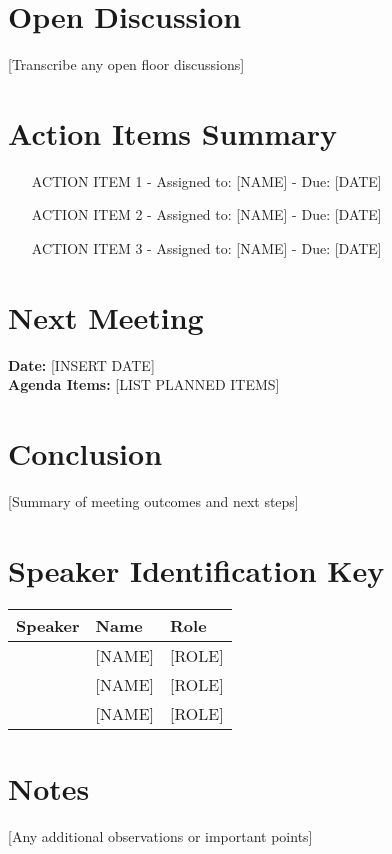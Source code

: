 \documentclass[12pt,a4paper]{article}
\begin{document}
\section{Open Discussion}
[Transcribe any open floor discussions]

\section{Action Items Summary}
\begin{itemize}
    \item [ACTION ITEM 1] - Assigned to: [NAME] - Due: [DATE]
    \item [ACTION ITEM 2] - Assigned to: [NAME] - Due: [DATE]
    \item [ACTION ITEM 3] - Assigned to: [NAME] - Due: [DATE]
\end{itemize}

\section{Next Meeting}
\textbf{Date:} [INSERT DATE] \\
\textbf{Agenda Items:} [LIST PLANNED ITEMS]

\section{Conclusion}
[Summary of meeting outcomes and next steps]

\section*{Speaker Identification Key}
\begin{tabular}{lll}
\textbf{Speaker} & \textbf{Name} & \textbf{Role} \\
\hline
[SPEAKER 1] & [NAME] & [ROLE] \\
[SPEAKER 2] & [NAME] & [ROLE] \\
[SPEAKER 3] & [NAME] & [ROLE] \\
\end{tabular}

\section*{Notes}
[Any additional observations or important points]
\end{document}
